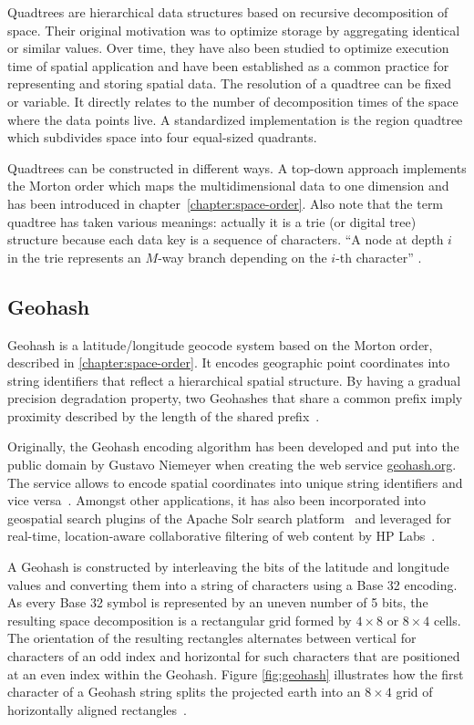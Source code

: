 Quadtrees are hierarchical data structures based on recursive decomposition of space. Their original motivation was to optimize storage by aggregating identical or similar values. Over time, they have also been studied to optimize execution time of spatial application and have been established as a common practice for representing and storing spatial data. The resolution of a quadtree can be fixed or variable. It directly relates to the number of decomposition times of the space where the data points live. A standardized implementation is the region quadtree which subdivides space into four equal-sized quadrants.


Quadtrees can be constructed in different ways. A top-down approach implements the Morton order which maps the multidimensional data to one dimension and has been introduced in chapter~\ref{chapter:space-order}. Also note that the term quadtree has taken various meanings: actually it is a trie (or digital tree) structure because each data key is a sequence of characters. ``A node at depth $i$ in the trie represents an $M$-way branch depending on the $i$-th character'' \cite{Samet90spatialdata}.

\subsection{Geohash}
\label{chapter:geohash}

Geohash is a latitude/longitude geocode system based on the Morton order, described in \ref{chapter:space-order}. It encodes geographic point coordinates into string identifiers that reflect a hierarchical spatial structure. By having a gradual precision degradation property, two Geohashes that share a common prefix imply proximity described by the length of the shared prefix~\cite{wiki:geohash, Smiley11geohash}.

Originally, the Geohash encoding algorithm has been developed and put into the public domain by Gustavo Niemeyer when creating the web service \href{http://geohash.org}{geohash.org}. The service allows to encode spatial coordinates into unique string identifiers and vice versa~\cite{wiki:geohash}. Amongst other applications, it has also been incorporated into geospatial search plugins of the Apache Solr search platform~\cite{Smiley11geohash} and leveraged for real-time, location-aware collaborative filtering of web content by HP Labs~\cite{Sand11geohashapp}.

A Geohash is constructed by interleaving the bits of the latitude and longitude values and converting them into a string of characters using a Base 32 encoding. As every Base 32 symbol is represented by an uneven number of 5 bits, the resulting  space decomposition is a rectangular grid formed by $4 \times 8$ or $8 \times 4$ cells. The orientation of the resulting rectangles alternates between vertical for characters of an odd index and horizontal for such characters that are positioned at an even index within the Geohash. Figure \ref{fig:geohash} illustrates how the first character of a Geohash string splits the projected earth into an $8 \times 4$ grid of horizontally aligned rectangles~\cite{wiki:geohash, Smiley11geohash}.

